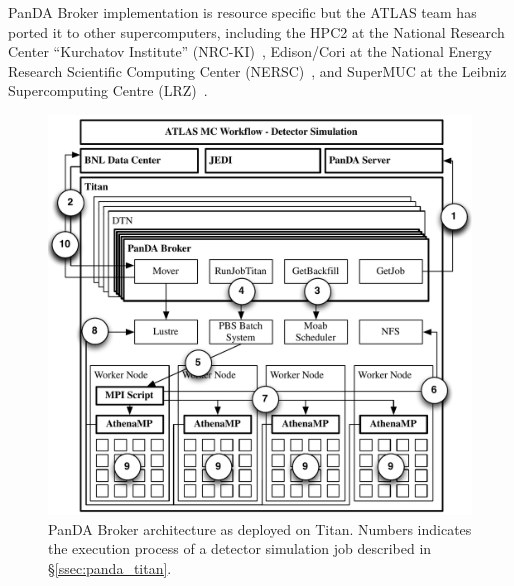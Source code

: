 PanDA Broker implementation is resource specific but the ATLAS team has
ported it to other supercomputers, including the HPC2 at the National
Research Center ``Kurchatov Institute''
(NRC-KI)~\cite{belyaev2015integration}, Edison/Cori at the National Energy
Research Scientific Computing Center (NERSC)~\cite{barreiro2016panda}, and
SuperMUC at the Leibniz Supercomputing Centre (LRZ)~\cite{barreiro2016panda}.

\begin{figure}
    \centering
    \includegraphics[width=\columnwidth]{figures/panda_broker_architecture.pdf}
    \vspace{-0.3in}
    \caption{PanDA Broker architecture as deployed on Titan. Numbers
    indicates the execution process of a detector simulation job described in
    \S\ref{ssec:panda_titan}.}\label{fig:panda_broker}
\end{figure}
\vspace{-0.04in}

